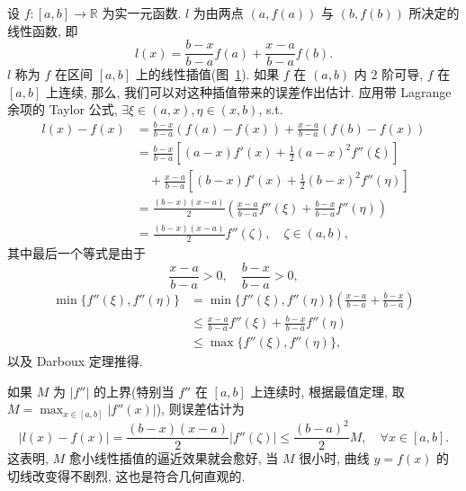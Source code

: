 \begin{example}[线性插值的误差公式]\label{ex:4.2.10}
设 $f\colon [a, b] \to \mathbb{R}$ 为实一元函数. $l$ 为由两点 $(a, f(a))$ 与 $(b, f(b))$ 所决定的线性函数, 即
\[
l(x)=\frac{b-x}{b-a}f(a)+\frac{x-a}{b-a}f(b).
\]
$l$ 称为 $f$ 在区间 $[a,b]$ 上的线性插值(图~\ref{fig:4.2.2}). 如果 $f$ 在 $(a,b)$ 内 $2$ 阶可导, $f$ 在 $[a,b]$ 上连续, 那么, 我们可以对这种插值带来的误差作出估计. 应用带 Lagrange 余项的 Taylor 公式, $\exists\xi\in(a,x),\eta\in(x,b)$, s.t.
\begin{align*}
l(x)-f(x)
&=\frac{b-x}{b-a}(f(a)-f(x))+\frac{x-a}{b-a}(f(b)-f(x)) \\
&=\frac{b-x}{b-a}\left[(a-x)f'(x)+\frac{1}{2}(a-x)^2f''(\xi)\right] \\
&\quad +\frac{x-a}{b-a}\left[(b-x)f'(x)+\frac{1}{2}(b-x)^2f''(\eta)\right] \\
&=\frac{(b-x)(x-a)}{2}\left(\frac{x-a}{b-a}f''(\xi)+\frac{b-x}{b-a}f''(\eta)\right) \\
&=\frac{(b-x)(x-a)}{2}f''(\zeta),\quad\zeta\in(a,b),
\end{align*}
其中最后一个等式是由于
\[
\frac{x-a}{b-a}>0,\quad\frac{b-x}{b-a}>0,
\]
\begin{align*}
\min\{f''(\xi),f''(\eta)\}
&=\min\{f''(\xi),f''(\eta)\}\left(\frac{x-a}{b-a}+\frac{b-x}{b-a}\right) \\
&\leqslant\frac{x-a}{b-a}f''(\xi)+\frac{b-x}{b-a}f''(\eta) \\
&\leqslant\max\{f''(\xi),f''(\eta)\},
\end{align*}
以及 Darboux 定理推得.

如果 $M$ 为 $|f''|$ 的上界(特别当 $f''$ 在 $[a,b]$ 上连续时, 根据最值定理, 取 $M = \max_{x \in [a,b]} |f''(x)|$), 则误差估计为
\[
|l(x)-f(x)|=\frac{(b-x)(x-a)}{2}|f''(\zeta)|\leqslant\frac{(b-a)^{2}}{2}M,\quad\forall x\in[a,b].
\]
这表明, $M$ 愈小线性插值的逼近效果就会愈好, 当 $M$ 很小时, 曲线 $y = f(x)$ 的切线改变得不剧烈, 这也是符合几何直观的.
\end{example}

\begin{figure}[htbp]
\centering
{}
\caption{}\label{fig:4.2.2}
\end{figure}

